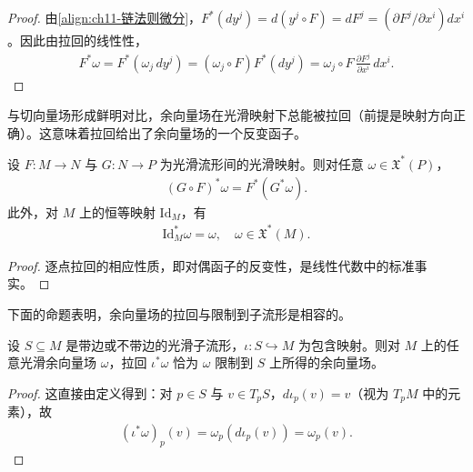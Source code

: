 \documentclass[../../main.tex]{subfiles}
\begin{document}
\begin{proof}
由\eqref{align:ch11-链法则微分}，$F^*(dy^j)=d(y^j\circ F)=dF^j=(\partial F^j/\partial x^i)dx^i$。因此由拉回的线性性，
\begin{align*}
F^*\omega=F^*(\omega_j\,dy^j)=(\omega_j\circ F)F^*(dy^j)=\omega_j\circ F\,\frac{\partial F^j}{\partial x^i}\,dx^i.
\end{align*}
\end{proof}

与切向量场形成鲜明对比，余向量场在光滑映射下总能被拉回（前提是映射方向正确）。这意味着拉回给出了余向量场的一个反变函子。

\begin{proposition}[拉回的函子性质]\label{proposition:ch11-拉回函子}
设 $F\colon M\to N$ 与 $G\colon N\to P$ 为光滑流形间的光滑映射。则对任意 $\omega\in\mathfrak X^*(P)$，
\begin{align}
(G\circ F)^*\omega=F^*(G^*\omega).\label{align:ch11-拉回复合}
\end{align}
此外，对 $M$ 上的恒等映射 $\mathrm{Id}_M$，有
\begin{align}
\mathrm{Id}_M^*\omega=\omega,\quad \omega\in\mathfrak X^*(M).\label{align:ch11-恒等拉回}
\end{align}
\end{proposition}

\begin{proof}
逐点拉回的相应性质，即对偶函子的反变性，是线性代数中的标准事实。
\end{proof}

下面的命题表明，余向量场的拉回与限制到子流形是相容的。

\begin{proposition}[拉回与限制]\label{proposition:ch11-拉回与限制}
设 $S\subseteq M$ 是带边或不带边的光滑子流形，$\iota\colon S\hookrightarrow M$ 为包含映射。则对 $M$ 上的任意光滑余向量场 $\omega$，拉回 $\iota^*\omega$ 恰为 $\omega$ 限制到 $S$ 上所得的余向量场。
\end{proposition}

\begin{proof}
这直接由定义得到：对 $p\in S$ 与 $v\in T_pS$，$d\iota_p(v)=v$（视为 $T_pM$ 中的元素），故
\begin{align*}
(\iota^*\omega)_p(v)=\omega_p(d\iota_p(v))=\omega_p(v).
\end{align*}
\end{proof}
\end{document}
